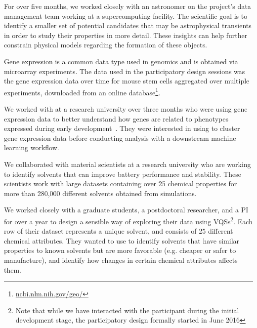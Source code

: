 For over five months, we worked closely with an astronomer on the project's data management team working at a supercomputing facility.  The scientific goal is to identify a smaller set of potential candidates that may be astrophysical transients in order to study their properties in more detail. These insights can help further constrain physical models regarding the formation of these objects.

 Gene expression is a common data type used in genomics and is obtained via microarray experiments.  The data used in the participatory design sessions was the gene expression data over time for mouse stem cells aggregated over multiple experiments, downloaded from an online database\footnote{\url{ncbi.nlm.nih.gov/geo/}}. 
\par  We worked with  at a research university over three months who were using gene expression data to better understand how genes are related to phenotypes expressed during early development~\cite{Peng2016,Gloss2017}. They were interested in using \zv to cluster gene expression data before conducting analysis with a downstream machine learning workflow. 

 We collaborated with material scientists at a research university who are working to identify solvents that can improve battery performance and stability. These scientists work with large datasets containing over 25 chemical properties for more than 280,000 different solvents obtained from simulations. 
\par We worked closely with a graduate students, a postdoctoral researcher, and a PI for over a year to design a sensible way of exploring their data using VQSs\footnote{Note that while we have interacted with the \matsci participant during the initial development stage, the participatory design formally started in June 2016}. Each row of their dataset represents a unique solvent, and consists of 25 different chemical attributes. They wanted to use \zv to identify solvents that have similar properties to known solvents but are more favorable (e.g. cheaper or safer to manufacture), and identify how changes in certain chemical attributes affects them.
\raggedbottom
